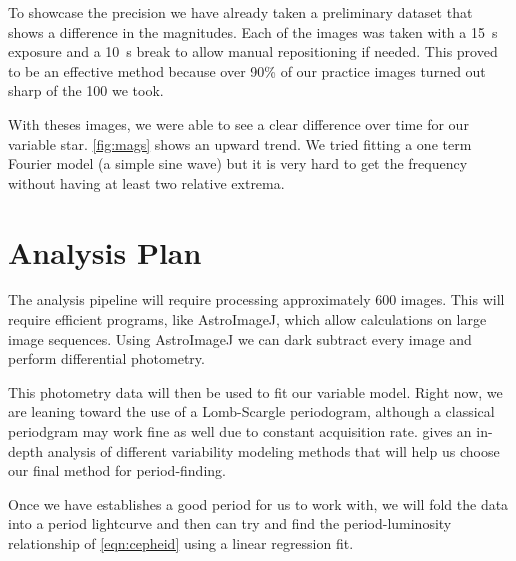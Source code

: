 \documentclass[]{article}
\begin{document}
	To showcase the precision we have already taken a preliminary dataset that shows a difference in the magnitudes. Each of the images was taken with a \SI{15}{\second} exposure and a \SI{10}{\second} break to allow manual repositioning if needed. This proved to be an effective method because over 90\% of our practice images turned out sharp of the 100 we took.
	
	With theses images, we were able to see a clear difference over time for our variable star. \autoref{fig:mags} shows an upward trend. We tried fitting a one term Fourier model (a simple sine wave) but it is very hard to get the frequency without having at least two relative extrema.
	
\section{Analysis Plan}

	The analysis pipeline will require processing approximately 600 images. This will require efficient programs, like AstroImageJ, which allow calculations on large image sequences. Using AstroImageJ we can dark subtract every image and perform differential photometry. 
	
	This photometry data will then be used to fit our variable model. Right now, we are leaning toward the use of a Lomb-Scargle periodogram, although a classical periodgram may work fine as well due to constant acquisition rate. \textcite{2017arXiv170309824V} gives an in-depth analysis of different variability modeling methods that will help us choose our final method for period-finding.
	
	Once we have establishes a good period for us to work with, we will fold the data into a period lightcurve and then can try and find the period-luminosity relationship of \autoref{eqn:cepheid} using a linear regression fit.
	



\printbibliography

\newpage
\appendix
\end{document}
